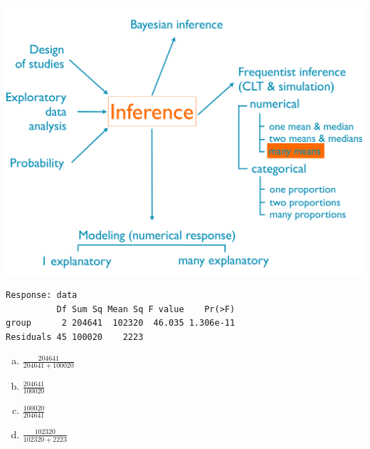 \documentclass[11pt,containsverbatim,handout,xcolor=xelatex,dvipsnames,table]{beamer}
\newcommand{\solnMult}[1]{#1}
\newcommand{\soln}[1]{}
\begin{document}
\begin{frame}[fragile]

{
{\scriptsize
{}}}
{
 \includegraphics[width=\textwidth]{figures/map/many_mean}
}

{\scriptsize
\begin{verbatim}
Response: data
          Df Sum Sq Mean Sq F value    Pr(>F)
group      2 204641  102320  46.035 1.306e-11
Residuals 45 100020    2223                  
\end{verbatim}
}

\begin{enumerate}[(a)]
\item \solnMult{ $\frac{204641}{204641 + 100020}$ } \soln{\only<2>{\red{ = 0.67}}}
\item $\frac{204641}{100020}$
\item $\frac{100020}{204641}$
\item $\frac{102320}{102320 + 2223}$
\end{enumerate}

\end{frame}

\end{document}
